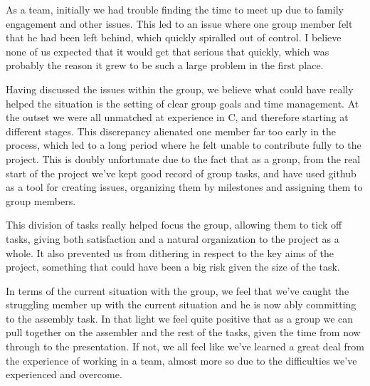 \documentclass[11pt]{article}
\begin{document}
As a team, initially we had trouble finding the time to meet up due to family engagement and other issues. This led to an issue where one group member felt that he had been left behind, which quickly spiralled out of control. I believe none of us expected that it would get that serious that quickly, which was probably the reason it grew to be such a large problem in the first place.

Having discussed the issues within the group, we believe what could have really helped the situation is the setting of clear group goals and time management. At the outset we were all unmatched at experience in C, and therefore starting at different stages. This discrepancy alienated one member far too early in the process, which led to a long period where he felt unable to contribute fully to the project. This is doubly unfortunate due to the fact that as a group, from the real start of the project we've kept good record of group tasks, and have used github as a tool for creating issues, organizing them by milestones and assigning them to group members.

This division of tasks really helped focus the group, allowing them to tick off tasks, giving both satisfaction and a natural organization to the project as a whole. It also prevented us from dithering in respect to the key aims of the project, something that could have been a big risk given the size of the task.

In terms of the current situation with the group, we feel that we've caught the struggling member up with the current situation and he is now ably committing to the assembly task. In that light we feel quite positive that as a group we can pull together on the assembler and the rest of the tasks, given the time from now through to the presentation. If not, we all feel like we've learned a great deal from the experience of working in a team, almost more so due to the difficulties we've experienced and overcome.
\end{document}
